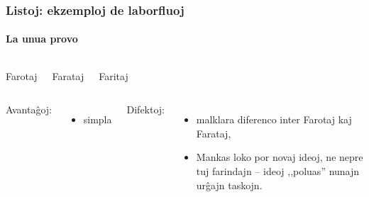   \begin{frame}
    \frametitle{Listoj: ekzemploj de laborfluoj}
    \framesubtitle{La unua provo}
    
    	\begin{columns}
	    \begin{block}
	    
	    	Far\alert{ot}aj
	    	
	    \end{block}
    	\begin{block}
    	
    		Far\alert{at}aj
    		
   		\end{block}
    	\begin{block}
    	
    		Far\alert{it}aj
    		
    	\end{block}
	\end{columns}
    \vspace{1em}
    	\begin{columns}
    Avantaĝoj:
    \begin{itemize}
    		\item simpla
    \end{itemize}
	\column{0.5\textwidth}
    Difektoj:
    \begin{itemize}
    		\item malklara diferenco inter Farotaj kaj Farataj,
    		\item Mankas loko por novaj ideoj, ne nepre tuj farindajn -- ideoj ,,poluas'' nunajn urĝajn taskojn.
    \end{itemize}
    	
	\end{columns}
  \end{frame}


